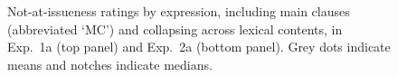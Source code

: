 \documentclass[11pt,fleqn]{article}
\newcommand{\6}{\mbox{$[\hspace*{-.6mm}[$}}
\newcommand{\9}{\mbox{$]\hspace*{-.6mm}]$}}
\newcommand{\figref}[1]{Fig.~\ref{#1}}
\begin{document}
\begin{figure}[h!]
\begin{center}



\end{center}
\caption{Not-at-issueness ratings by expression, including main clauses (abbreviated `MC') and collapsing across lexical contents, in Exp.~1a (top panel) and Exp.~2a (bottom panel). Grey dots indicate means and notches indicate medians.}
\label{f-ai-a}
\end{figure}

\end{document}
